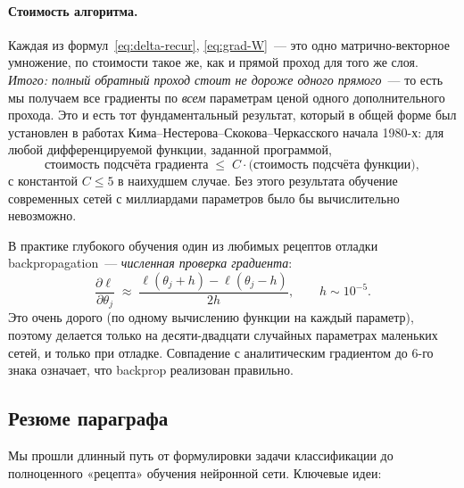 \paragraph{Стоимость алгоритма.}
Каждая из формул~\eqref{eq:delta-recur}, \eqref{eq:grad-W}~--- это одно
матрично-векторное умножение, по стоимости такое же, как и прямой
проход для того же слоя. \emph{Итого: полный обратный проход стоит
не дороже одного прямого}~--- то есть мы получаем все градиенты по
\emph{всем} параметрам ценой одного дополнительного прохода. Это и есть
тот фундаментальный результат, который в общей форме был установлен в
работах Кима--Нестерова--Скокова--Черкасского начала 1980-х: для любой
дифференцируемой функции, заданной программой,
\[
\boxed{\;\text{стоимость подсчёта градиента}\;\leq\;C\cdot\text{(стоимость подсчёта функции)},\;}
\]
с константой $C\leq 5$ в наихудшем случае. Без этого результата
обучение современных сетей с миллиардами параметров было бы
вычислительно невозможно.

\begin{notebox}[title={Что именно проверять, если backprop «сломан»}]
В практике глубокого обучения один из любимых рецептов отладки
backpropagation~--- \emph{численная проверка градиента}:
\[
\frac{\partial\ell}{\partial\theta_j}\;\approx\;\frac{\ell(\theta_j+h)-\ell(\theta_j-h)}{2h},
\qquad h\sim 10^{-5}.
\]
Это очень дорого (по одному вычислению функции на каждый параметр),
поэтому делается только на десяти-двадцати случайных параметрах
маленьких сетей, и только при отладке. Совпадение с аналитическим
градиентом до 6-го знака означает, что backprop реализован правильно.
\end{notebox}

\subsection{Резюме параграфа}

Мы прошли длинный путь от формулировки задачи классификации до
полноценного «рецепта» обучения нейронной сети. Ключевые идеи:


